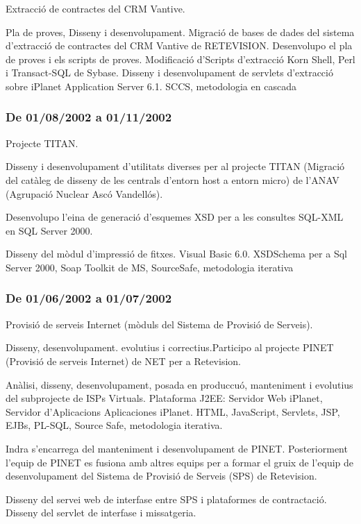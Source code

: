 \documentclass[11pt]{article}
\begin{document}
Extracció de contractes del CRM Vantive.

Pla de proves, Disseny i desenvolupament. Migració de bases de dades del sistema d’extracció de contractes del CRM Vantive de RETEVISION. Desenvolupo el pla de proves i els scripts de proves. Modificació d’Scripts d’extracció Korn Shell, Perl i Transact-SQL de Sybase. Disseny i desenvolupament de servlets d’extracció sobre iPlanet Application Server 6.1. SCCS, metodologia en cascada
\subsubsection{De 01/08/2002 a 01/11/2002}
\label{sec-5-1-12}

Projecte TITAN.

Disseny i desenvolupament d’utilitats diverses per al projecte TITAN (Migració del catàleg de disseny de les centrals d’entorn host a entorn micro) de l’ANAV (Agrupació Nuclear Ascó Vandellós). 

Desenvolupo l’eina de generació d’esquemes XSD per a les consultes SQL-XML en SQL Server 2000. 

Disseny del mòdul d’impressió de fitxes. Visual Basic 6.0. XSDSchema per a Sql Server 2000, Soap Toolkit de MS, SourceSafe,  metodologia iterativa
\subsubsection{De 01/06/2002 a 01/07/2002}
\label{sec-5-1-13}

Provisió de serveis Internet (mòduls del Sistema de Provisió de Serveis).

Disseny, desenvolupament. evolutius i correctius.Participo al projecte PINET (Provisió de serveis Internet) de NET per a Retevision. 

Anàlisi, disseny, desenvolupament, posada en produccuó, manteniment i evolutius del subprojecte de ISPs Virtuals. Plataforma J2EE: Servidor Web iPlanet, Servidor d’Aplicacions Aplicaciones iPlanet. HTML, JavaScript, Servlets, JSP, EJBs, PL-SQL, Source Safe, metodologia iterativa.

Indra s’encarrega del manteniment i desenvolupament de PINET. Posteriorment l’equip de PINET es fusiona amb altres equips per a formar el gruix de l’equip de desenvolupament del Sistema de Provisió de Serveis (SPS) de Retevision.

Disseny del servei web de interfase entre SPS i plataformes de contractació. Disseny del servlet de interfase i missatgeria.
\end{document}
